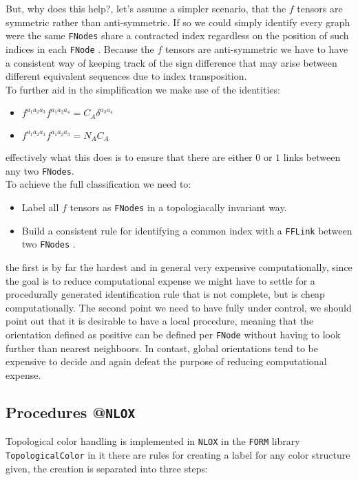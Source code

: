 \documentclass[a4paper]{article}
\def \FNode{\texttt{FNode} }
\def \FNodes{\texttt{FNodes} }
\def \FFLink{\texttt{FFLink} }
\def \NLOX{\texttt{NLOX} }
\begin{document}
But, why does this help?, let's assume a simpler scenario, that the $f$ tensors are symmetric rather than anti-symmetric. If so we could simply identify every graph were the same \FNodes share a contracted index
regardless on the position of such indices in each \FNode. Because the $f$ tensors are anti-symmetric 
we have to have a consistent way of keeping track of the sign difference that may arise between 
different equivalent sequences due to index transposition.\\

To further aid in the simplification we make use of the identities:
\begin{itemize}
 \item $f^{a_1 a_2 a_3} f^{a_1a_2a_4} = C_A \delta^{a_3a_4}$
 \item $f^{a_1 a_2 a_3} f^{a_1a_2a_3} = N_A C_A $
\end{itemize}
effectively what this does is to ensure that there are either $0$ or $1$ links between any two \texttt{FNodes}.\\

\noindent To achieve the full classification we need to:

\begin{itemize}
 \item Label all $f$ tensors as \FNodes in a topologiacally invariant way.
 \item Build a consistent rule for identifying a common index with a \FFLink between two \FNodes.
\end{itemize}
the first is by far the hardest and in general very expensive computationally, since the goal is to reduce computational expense we might have to settle for a procedurally generated identification rule that is not complete, but is cheap computationally.
The second point we need to have fully under control, we should point out that it is desirable 
to have a local procedure, meaning that the orientation defined as positive can be defined per \FNode
without having to look further than nearest neighboors. In contast, global orientations tend to be expensive 
to decide and again defeat the purpose of reducing computational expense.\\

\subsection{Procedures @\NLOX}
Topological color handling is implemented in \NLOX in the \texttt{FORM} library \texttt{TopologicalColor} in 
it there are rules for creating a label for any color structure given, the creation is separated into three 
steps:\\
\end{document}
